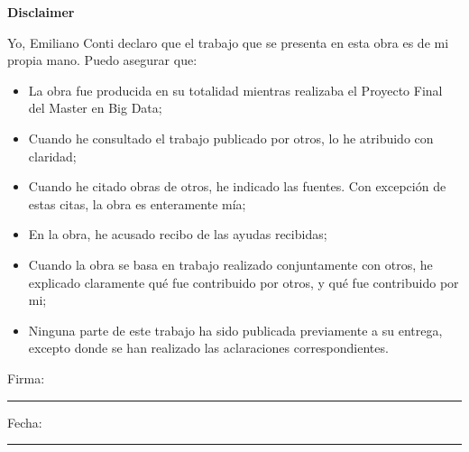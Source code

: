 
\thispagestyle{empty}

\begin{center}
    \Large\bfseries Disclaimer
\end{center}
\vspace{1cm}

\noindent Yo, Emiliano Conti declaro que el trabajo que se presenta en esta obra es de mi propia mano. Puedo asegurar que:

\begin{itemize}
    \item La obra fue producida en su totalidad mientras realizaba el Proyecto Final del Master en Big Data;
    \item Cuando he consultado el trabajo publicado por otros, lo he atribuido con claridad;
    \item Cuando he citado obras de otros, he indicado las fuentes. Con excepci\'on de estas citas, la obra es enteramente m\'ia;
    \item En la obra, he acusado recibo de las ayudas recibidas;
    \item Cuando la obra se basa en trabajo realizado conjuntamente con otros, he explicado claramente qu\'e fue contribuido por otros, y qu\'e fue contribuido por mi;
    \item Ninguna parte de este trabajo ha sido publicada previamente a su entrega, excepto donde se han realizado las aclaraciones correspondientes.
\end{itemize}

\vspace{2cm}

\noindent Firma: \rule{5cm}{0.1pt}

\vspace{1cm}

\noindent Fecha: \rule{5cm}{0.1pt}